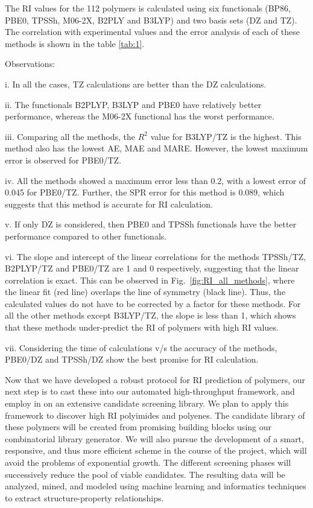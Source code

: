 The RI values for the 112 polymers is calculated using six functionals (BP86, PBE0, TPSSh, M06-2X, B2PLY and B3LYP) and two basis sets (DZ and TZ). The correlation with experimental values and the error analysis of each of these methods is shown in the table \ref{tab:1}. 

Observations:

i. In all the cases, TZ calculations are better than the DZ calculations. 

ii. The functionals B2PLYP, B3LYP and PBE0 have relatively better performance, whereas the M06-2X functional has the worst performance. 

iii. Comparing all the methods, the $R^2$ value for B3LYP/TZ is the highest. This method also has the lowest AE, MAE and MARE. However, the lowest maximum error is observed for PBE0/TZ. 

iv. All the methods showed a maximum error less than 0.2, with a lowest error of 0.045 for PBE0/TZ. Further, the SPR error for this method is 0.089, which suggests that this method is accurate for RI calculation. 

v. If only DZ is considered, then PBE0 and TPSSh functionals have the better performance compared to other functionals. 

vi. The slope and intercept of the linear correlations for the methods TPSSh/TZ, B2PLYP/TZ and PBE0/TZ are 1 and 0 respectively, suggesting that the linear correlation is exact. This can be observed in Fig.\ \ref{fig:RI_all_methods}, where the linear fit (red line) overlaps the line of symmetry (black line).  Thus, the calculated values do not have to be corrected by a factor for these methods. For all the other methods except B3LYP/TZ, the slope is less than 1, which shows that these methods under-predict the RI of polymers with high RI values.

vii. Considering the time of calculations v/s the accuracy of the methods, PBE0/DZ and TPSSh/DZ show the best promise for RI calculation. 

Now that we have developed a robust protocol for RI prediction of polymers, our next step is to cast these into our automated high-throughput framework, and employ in on an extensive candidate screening library. We plan to apply this framework to discover high RI polyimides and polyenes. The candidate library of these polymers will be created from promising building blocks using our combinatorial library generator. We will also pursue the development of a smart, responsive, and thus more efficient scheme in the course of the project, which will avoid the problems of exponential growth. The different screening phases will successively reduce the pool of viable candidates. The resulting data will be analyzed, mined, and modeled using machine learning and informatics techniques to extract structure-property relationships.



